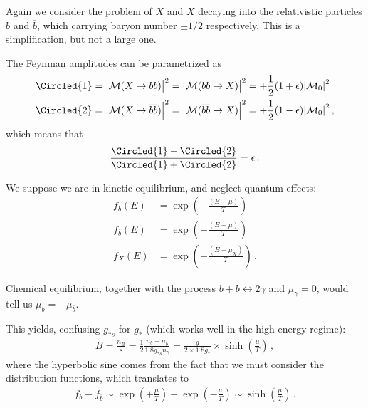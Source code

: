 \documentclass[main.tex]{subfiles}
\begin{document}

Again we consider the problem of \(X\) and \(\overline{X}\) decaying into the relativistic particles \(b\) and \(\overline{b}\), which carrying baryon number \(\pm 1/2 \) respectively. This is a simplification, but not a large one.

The Feynman amplitudes can be parametrized as 
%
\begin{align}
\Circled{1} = \abs{\mathcal{M}(X \to b b )}^2 &=
\abs{\mathcal{M}(b b \to X )}^2 =
+ \frac{1}{2} (1 + \epsilon ) \abs{\mathcal{M}_0}^2 \\
\Circled{2} = \abs{\mathcal{M}(X \to \overline{b} \overline{b} )}^2 &=
\abs{\mathcal{M}(\overline{b} \overline{b} \to X )}^2 =
+ \frac{1}{2} (1 - \epsilon ) \abs{\mathcal{M}_0}^2 
\,,
\end{align}
%
which means that  
%
\begin{align}
\frac{\Circled{1} - \Circled{2}}{\Circled{1} + \Circled{2}} = \epsilon 
\,.
\end{align}

We suppose we are in kinetic equilibrium, and neglect quantum effects: 
%
\begin{align}
f_b (E) &= \exp(- \frac{(E-\mu )}{T})  \\
f_{\overline{b}} (E) &= \exp(- \frac{(E + \mu )}{T}) \\
f_{X} (E) &= \exp(- \frac{(E - \mu_X )}{T}) 
\,.
\end{align}

Chemical equilibrium, together with the process \(b + \overline{b} \leftrightarrow 2 \gamma \) and \(\mu _\gamma = 0\), would tell us \(\mu _b = - \mu _{\overline{b}}\).

This yields, confusing \(g_{*s}\) for \(g_*\) (which works well in the high-energy regime):
%
\begin{align}
B = \frac{n_B}{s} =  \frac{1}{2 }\frac{n_b - n_{\overline{b}}}{\num{1.8} g_{*s} n_\gamma } =
\frac{g}{2 \times \num{1.8} g_*} \times \sinh( \frac{\mu}{T} )
\,,
\end{align}
%
where the hyperbolic sine comes from the fact that we must consider the distribution functions, which translates to 
%
\begin{align}
f_b - f_{\overline{b}} \sim 
\exp(+ \frac{\mu}{T}) - \exp(- \frac{\mu }{T}) \sim \sinh(\frac{\mu}{T})
\,.
\end{align}
\end{document}
